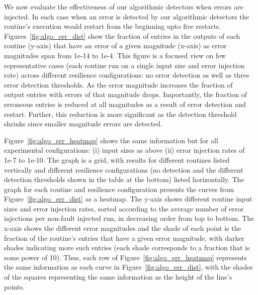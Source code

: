 \documentclass{sig-alternate}
\begin{document}
We now evaluate the effectiveness of our algorithmic detectors when errors are injected.
In each case when an error is detected by our algorithmic detectors the routine's execution would restart from the beginning upto five restarts.
Figures~\ref{fig:algo_err_dist} show the fraction of entries in the outputs of each routine (y-axis) that have an error of a given magnitude (x-axis) as error magnitudes span from 1e-14 to 1e-4.
This figure is a focused view on few representative cases (each routine run on a single input size and error injection rate) across different resilience configurations: no error detection as well as three error detection thresholds.
As the error magnitude increases the fraction of output entries with errors of that magnitude drops.
Importantly, the fraction of erroneous entries is reduced at all magnitudes as a result of error detection and restart.
Further, this reduction is more significant as the detection threshold shrinks since smaller magnitude errors are detected.

Figure~\ref{fig:algo_err_heatmap} shows the same information but for all experimental configurations: (i) input sizes as above (ii) error injection rates of 1e-7 to 1e-10.
The graph is a grid, with results for different routines listed vertically and different resilience configurations (no detection and the different detection thresholds shown in the table at the bottom) listed horizontally.
The graph for each routine and resilience configuration presents the curves from Figure~\ref{fig:algo_err_dist} as a heatmap.
The y-axis shows different routine input sizes and error injection rates, sorted according to the average number of error injections per non-fault injected run, in decreasing order from top to bottom.
The x-axis shows the different error magnitudes and the shade of each point is the fraction of the routine's entries that have a given error magnitude, with darker shades indicating more such entries (each shade corresponds to a fraction that is some power of 10).
Thus, each row of Figure~\ref{fig:algo_err_heatmap} represents the same information as each curve in Figure~\ref{fig:algo_err_dist}, with the shades of the squares representing the same information as the height of the line's points.
\end{document}
